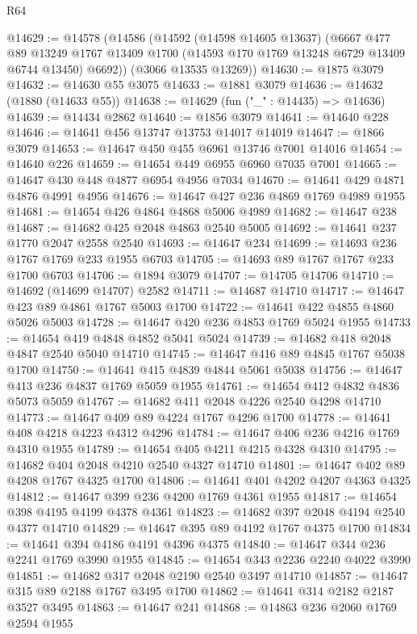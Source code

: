 \begin{lexlean}{R64}
\begin{coremodule}
@14629 := @14578
    (@14586
      (@14592
        (@14598 @14605 @13637)
        (@6667
          @477
          @89
          @13249
          @1767
          @13409
          @1700
          (@14593 @170 @1769 @13248 @6729 @13409 @6744 @13450)
          @6692))
      (@3066 @13535 @13269))
@14630 := @1875 @3079
@14632 := @14630 @55 @3075
@14633 := @1881 @3079
@14636 := @14632 (@1880 (@14633 @55))
@14638 := @14629 (fun ("_" : @14435) => @14636)
@14639 := @14434 @2862
@14640 := @1856 @3079
@14641 := @14640 @228
@14646 := @14641 @456 @13747 @13753 @14017 @14019
@14647 := @1866 @3079
@14653 := @14647 @450 @455 @6961 @13746 @7001 @14016
@14654 := @14640 @226
@14659 := @14654 @449 @6955 @6960 @7035 @7001
@14665 := @14647 @430 @448 @4877 @6954 @4956 @7034
@14670 := @14641 @429 @4871 @4876 @4991 @4956
@14676 := @14647 @427 @236 @4869 @1769 @4989 @1955
@14681 := @14654 @426 @4864 @4868 @5006 @4989
@14682 := @14647 @238
@14687 := @14682 @425 @2048 @4863 @2540 @5005
@14692 := @14641 @237 @1770 @2047 @2558 @2540
@14693 := @14647 @234
@14699 := @14693 @236 @1767 @1769 @233 @1955 @6703
@14705 := @14693 @89 @1767 @1767 @233 @1700 @6703
@14706 := @1894 @3079
@14707 := @14705 @14706
@14710 := @14692 (@14699 @14707) @2582
@14711 := @14687 @14710
@14717 := @14647 @423 @89 @4861 @1767 @5003 @1700
@14722 := @14641 @422 @4855 @4860 @5026 @5003
@14728 := @14647 @420 @236 @4853 @1769 @5024 @1955
@14733 := @14654 @419 @4848 @4852 @5041 @5024
@14739 := @14682 @418 @2048 @4847 @2540 @5040 @14710
@14745 := @14647 @416 @89 @4845 @1767 @5038 @1700
@14750 := @14641 @415 @4839 @4844 @5061 @5038
@14756 := @14647 @413 @236 @4837 @1769 @5059 @1955
@14761 := @14654 @412 @4832 @4836 @5073 @5059
@14767 := @14682 @411 @2048 @4226 @2540 @4298 @14710
@14773 := @14647 @409 @89 @4224 @1767 @4296 @1700
@14778 := @14641 @408 @4218 @4223 @4312 @4296
@14784 := @14647 @406 @236 @4216 @1769 @4310 @1955
@14789 := @14654 @405 @4211 @4215 @4328 @4310
@14795 := @14682 @404 @2048 @4210 @2540 @4327 @14710
@14801 := @14647 @402 @89 @4208 @1767 @4325 @1700
@14806 := @14641 @401 @4202 @4207 @4363 @4325
@14812 := @14647 @399 @236 @4200 @1769 @4361 @1955
@14817 := @14654 @398 @4195 @4199 @4378 @4361
@14823 := @14682 @397 @2048 @4194 @2540 @4377 @14710
@14829 := @14647 @395 @89 @4192 @1767 @4375 @1700
@14834 := @14641 @394 @4186 @4191 @4396 @4375
@14840 := @14647 @344 @236 @2241 @1769 @3990 @1955
@14845 := @14654 @343 @2236 @2240 @4022 @3990
@14851 := @14682 @317 @2048 @2190 @2540 @3497 @14710
@14857 := @14647 @315 @89 @2188 @1767 @3495 @1700
@14862 := @14641 @314 @2182 @2187 @3527 @3495
@14863 := @14647 @241
@14868 := @14863 @236 @2060 @1769 @2594 @1955

\end{coremodule}
\end{lexlean}
